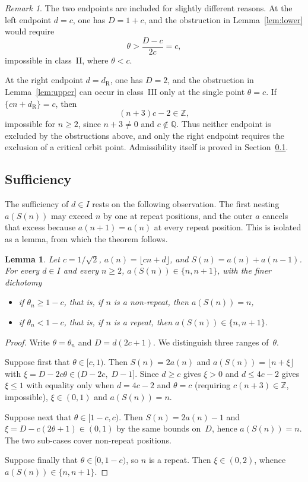 \documentclass{birkjour}
\newtheorem{lemma}[theorem]{Lemma}
\theoremstyle{definition}
\theoremstyle{remark}
\newtheorem{remark}[theorem]{Remark}
\newcommand{\fl}[1]{\lfloor #1 \rfloor}
\begin{document}
\begin{remark}
The two endpoints are included for slightly different reasons.
At the left endpoint $d=c$, one has $D=1+c$, and the
obstruction in Lemma~\ref{lem:lower} would require
\[
  \theta>\frac{D-c}{2c}=c,
\]
impossible in class~II, where $\theta<c$.

At the right endpoint $d=d_{\mathrm{R}}$, one has $D=2$, and the
obstruction in Lemma~\ref{lem:upper} can occur in class~III
only at the single point $\theta=c$. If $\{cn+d_{\mathrm{R}}\}=c$,
then
\[
  (n+3)c-2\in\mathbb{Z},
\]
impossible for $n\ge 2$, since $n+3\ne 0$ and
$c\notin\mathbb{Q}$. Thus neither endpoint is excluded by the
obstructions above, and only the right endpoint requires the
exclusion of a critical orbit point. Admissibility itself is
proved in Section~\ref{ssec:sufficiency}.
\end{remark}

\subsection{Sufficiency}
\label{ssec:sufficiency}

The sufficiency of $d\in I$ rests on the following
observation. The first nesting $a(S(n))$ may exceed
$n$ by one at repeat positions, and the outer $a$
cancels that excess because $a(n+1)=a(n)$ at every
repeat position. This is isolated as a lemma, from
which the theorem follows.

\begin{lemma}\label{lem:absorption}
Let $c=1/\!\sqrt{2}$, $a(n)=\fl{cn+d}$, and
$S(n)=a(n)+a(n-1)$. For every $d\in I$ and every
$n\ge 2$, $a(S(n))\in\{n,n+1\}$, with the finer
dichotomy
\begin{itemize}
\item if $\theta_{n}\ge 1-c$, that is, if $n$ is a
  non-repeat, then $a(S(n))=n$,
\item if $\theta_{n}<1-c$, that is, if $n$ is a repeat,
  then $a(S(n))\in\{n,n+1\}$.
\end{itemize}
\end{lemma}

\begin{proof}
Write $\theta=\theta_{n}$ and $D=d(2c{+}1)$.
We distinguish three ranges of~$\theta$.

Suppose first that $\theta\in[c,1)$.
Then $S(n)=2a(n)$ and
$a(S(n))=\fl{n+\xi}$ with
$\xi=D-2c\theta\in(D-2c,\;D-1]$.
Since $d\ge c$ gives $\xi>0$
and $d\le 4c{-}2$ gives $\xi\le 1$
with equality only when $d=4c{-}2$ and $\theta=c$
(requiring $c(n{+}3)\in\mathbb{Z}$, impossible),
$\xi\in(0,1)$ and $a(S(n))=n$.

Suppose next that $\theta\in[1{-}c,c)$.
Then $S(n)=2a(n)-1$ and
$\xi=D-c(2\theta{+}1)\in(0,1)$
by the same bounds on~$D$, hence $a(S(n))=n$.
The two sub-cases cover non-repeat positions.

Suppose finally that $\theta\in[0,1{-}c)$, so
$n$ is a repeat.
Then $\xi\in(0,2)$, whence
$a(S(n))\in\{n,n{+}1\}$.
\end{proof}
\end{document}
